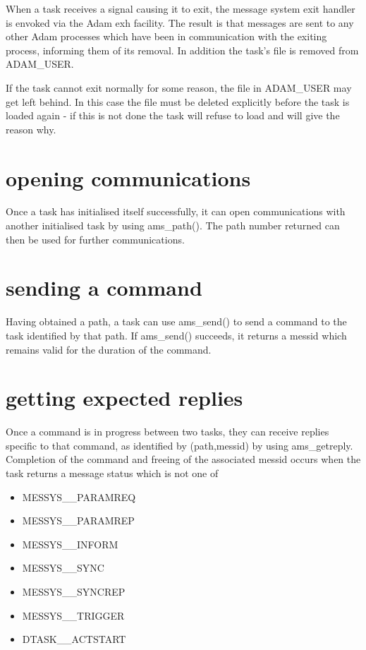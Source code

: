 When a task receives a signal causing it to exit, the message system exit
handler is envoked via the Adam exh facility. The result is that messages
are sent to any other Adam processes which have been in communication
with the exiting process, informing them of its removal. In addition the
task's file is removed from ADAM\_USER.

If the task cannot exit normally for some reason, the file in ADAM\_USER
may get left behind. In this case the file must be deleted explicitly
before the task is loaded again - if this is not done the task will
refuse to load and will give the reason why.


\section {opening communications}

Once a task has initialised itself successfully, it can open
communications with another initialised task by using ams\_path(). The
path number returned can then be used for further communications.


\section {sending a command}

Having obtained a path, a task can use ams\_send() to send a command to
the task identified by that path. If ams\_send() succeeds, it returns a
messid which remains valid for the duration of the command.


\section {getting expected replies}

Once a command is in progress between two tasks, they can receive replies
specific to that command, as identified by (path,messid) by using
ams\_getreply. Completion of the command and freeing of the associated
messid occurs when the task returns a message status which is not one of

\begin{itemize}
\item MESSYS\_\_PARAMREQ
\item MESSYS\_\_PARAMREP
\item MESSYS\_\_INFORM
\item MESSYS\_\_SYNC
\item MESSYS\_\_SYNCREP
\item MESSYS\_\_TRIGGER
\item DTASK\_\_ACTSTART
\end{itemize}

